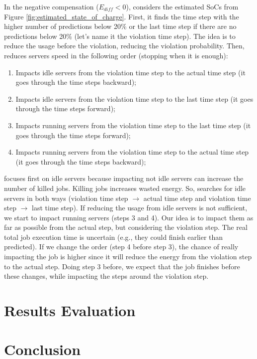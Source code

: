 In the negative compensation ($E_{diff}<0$), \emph{\systemName} considers the estimated SoCs from Figure \ref{fig:estimated_state_of_charge}. First, it finds the time step with the higher number of predictions below 20\% or the last time step if there are no predictions below 20\% (let's name it the violation time step). The idea is to reduce the usage before the violation, reducing the violation probability. Then, \emph{\systemName} reduces servers speed in the following order (stopping when it is enough):
\begin{enumerate}
    \item Impacts idle servers from the violation time step to the actual time step (it goes through the time steps backward);
    \item Impacts idle servers from the violation time step to the last time step (it goes through the time steps forward);
    \item Impacts running servers from the violation time step to the last time step (it goes through the time steps forward);
    \item Impacts running servers from the violation time step to the actual time step (it goes through the time steps backward);
\end{enumerate}

\emph{\systemName} focuses first on idle servers because impacting not idle servers can increase the number of killed jobs. Killing jobs increases wasted energy. So, \emph{\systemName} searches for idle servers in both ways (violation time step $\rightarrow$ actual time step and violation time step $\rightarrow$ last time step). If reducing the usage from idle servers is not sufficient, we start to impact running servers (steps 3 and 4). Our idea is to impact them as far as possible from the actual step, but considering the violation step. The real total job execution time is uncertain (e.g., they could finish earlier than predicted). If we change the order (step 4 before step 3), the chance of really impacting the job is higher since it will reduce the energy from the violation step to the actual step. Doing step 3 before, we expect that the job finishes before these changes, while impacting the steps around the violation step. 

\section{Results Evaluation}

\section{Conclusion}
